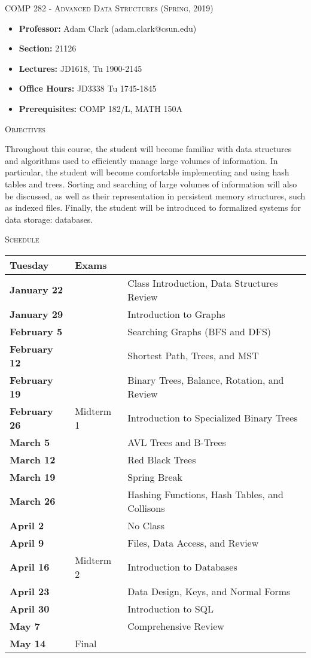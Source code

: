 \documentclass{letter}
\newcommand{\heading}[1]{{\large \textsc{#1}}}
\begin{document}
\heading{COMP 282 - Advanced Data Structures (Spring, 2019)}

\begin{itemize}
  \item[] {\bf Professor:} Adam Clark (adam.clark@csun.edu)
  \item[] {\bf Section:} 21126
  \item[] {\bf Lectures:} JD1618, Tu 1900-2145
  \item[] {\bf Office Hours:} JD3338 Tu 1745-1845
  \item[] {\bf Prerequisites:} COMP 182/L, MATH 150A
\end{itemize}

\heading{Objectives}

Throughout this course, the student will become familiar with data structures
and algorithms used to efficiently manage large volumes of information.  In
particular, the student will become comfortable implementing and using hash
tables and trees.  Sorting and searching of large volumes of information will
also be discussed, as well as their representation in persistent memory
structures, such as indexed files.  Finally, the student will be introduced to
formalized systems for data storage: databases.

\heading{Schedule}

\begin{center}
  \begin{tabular}{ | l | l | l | }
    \hline
    {\bf Tuesday} & {\bf Exams} & \\
    \hline
    {\bf January 22} & & Class Introduction, Data Structures Review \\
    {\bf January 29} & & Introduction to Graphs \\
    {\bf February 5} & & Searching Graphs (BFS and DFS) \\
    {\bf February 12} & & Shortest Path, Trees, and MST \\
    {\bf February 19} & & Binary Trees, Balance, Rotation, and Review \\
    {\bf February 26} & Midterm 1 & Introduction to Specialized Binary Trees \\
    {\bf March 5} & & AVL Trees and B-Trees \\
    {\bf March 12} & & Red Black Trees \\
    {\bf March 19} & & Spring Break \\
    {\bf March 26} & & Hashing Functions, Hash Tables, and Collisons \\
    {\bf April 2} & & No Class \\
    {\bf April 9} & & Files, Data Access, and Review \\
    {\bf April 16} & Midterm 2 & Introduction to Databases \\
    {\bf April 23} & & Data Design, Keys, and Normal Forms \\
    {\bf April 30} & & Introduction to SQL \\
    {\bf May 7} & & Comprehensive Review \\
    {\bf May 14} & Final & \\
    \hline
  \end{tabular}
\end{center}
\end{document}
